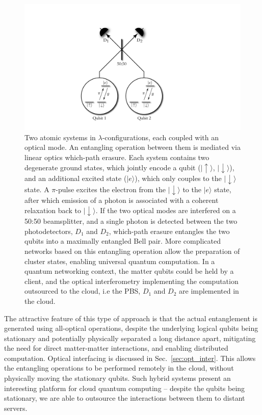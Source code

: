 \documentclass[aps,rmp,twocolumn,amsmath,amssymb,nofootinbib,superscriptaddress,longbibliography,floatfix]{revtex4-1}
\newcommand{\ket}[1]{|#1\rangle}
\begin{document}
\begin{figure}[!htb]
\includegraphics[width=0.75\columnwidth]{barrett_kok}
\caption{Two atomic systems in $\lambda$-configurations, each coupled with an optical mode. An entangling operation between them is mediated via linear optics which-path erasure. Each system contains two degenerate ground states, which jointly encode a qubit ($\ket{\!\uparrow}$, $\ket{\!\downarrow}$), and an additional excited state ($\ket{e}$), which only couples to the $\ket{\!\downarrow}$ state. A $\pi$-pulse excites the electron from the $\ket{\!\downarrow}$ to the $\ket{e}$ state, after which emission of a photon is associated with a coherent relaxation back to $\ket{\!\downarrow}$. If the two optical modes are interfered on a 50:50 beamsplitter, and a single photon is detected between the two photodetectors, $D_1$ and $D_2$, which-path erasure entangles the two qubits into a maximally entangled Bell pair. More complicated networks based on this entangling operation allow the preparation of cluster states, enabling universal quantum computation. In a quantum networking context, the matter qubits could be held by a client, and the optical interferometry implementing the computation outsourced to the cloud, i.e the PBS, $D_1$ and $D_2$ are implemented in the cloud.} \label{fig:barrett_kok}
\end{figure}

The attractive feature of this type of approach is that the actual entanglement is generated using all-optical operations, despite the underlying logical qubits being stationary and potentially physically separated a long distance apart, mitigating the need for direct matter-matter interactions, and enabling distributed computation. Optical interfacing is discussed in Sec.~\ref{sec:opt_inter}. This allows the entangling operations to be performed remotely in the cloud, without physically moving the stationary qubits. Such hybrid systems present an interesting platform for cloud quantum computing -- despite the qubits being stationary, we are able to outsource the interactions between them to distant servers.
\end{document}
